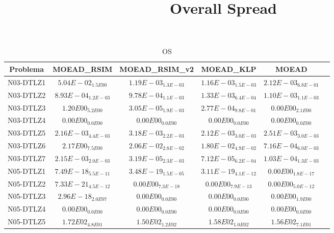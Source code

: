 \documentclass{article}
\title{Overall Spread}
\author{}
\begin{document}
\maketitle
\begin{table*}[ht!]
\scriptsize
\caption{OS}
\centering\begin{tabular}{|c||c||c||c||c||c|} \hline
Problema &MOEAD_RSIM &MOEAD_RSIM_v2 &MOEAD_KLP &MOEAD\\\hline
N03-DTLZ1 &\cellcolor{gray95}$5.04E-02_{1.5E00}$ &$1.19E-03_{1.3E-03}$ &$1.16E-03_{1.5E-03}$ &\cellcolor{gray25}$2.12E-03_{6.8E-01}$\\ 
\hline
N03-DTLZ2 &$8.93E-04_{1.2E-03}$ &$9.78E-04_{1.1E-03}$ &\cellcolor{gray95}$1.33E-03_{6.4E-04}$ &\cellcolor{gray25}$1.10E-03_{1.1E-03}$\\ 
\hline
N03-DTLZ3 &\cellcolor{gray95}$1.20E00_{5.2E00}$ &$3.05E-05_{1.9E-03}$ &\cellcolor{gray25}$2.77E-04_{9.8E-01}$ &$0.00E00_{2.1E00}$\\ 
\hline
N03-DTLZ4 &\cellcolor{gray95}$0.00E00_{0.0E00}$ &\cellcolor{gray25}$0.00E00_{0.0E00}$ &$0.00E00_{0.0E00}$ &$0.00E00_{0.0E00}$\\ 
\hline
N03-DTLZ5 &$2.16E-03_{4.4E-03}$ &\cellcolor{gray95}$3.18E-03_{2.2E-03}$ &$2.12E-03_{3.0E-03}$ &\cellcolor{gray25}$2.51E-03_{3.0E-03}$\\ 
\hline
N03-DTLZ6 &\cellcolor{gray95}$2.17E00_{7.5E00}$ &\cellcolor{gray25}$2.06E-02_{2.8E-02}$ &$1.80E-02_{4.9E-02}$ &$7.16E-04_{6.0E-03}$\\ 
\hline
N03-DTLZ7 &\cellcolor{gray95}$2.15E-03_{2.0E-03}$ &$3.19E-05_{2.3E-03}$ &$7.12E-05_{6.2E-04}$ &\cellcolor{gray25}$1.03E-04_{1.3E-03}$\\ 
\hline
N05-DTLZ1 &\cellcolor{gray95}$7.49E-18_{5.5E-11}$ &\cellcolor{gray25}$3.48E-19_{1.5E-05}$ &$3.11E-19_{4.1E-12}$ &$0.00E00_{1.8E-17}$\\ 
\hline
N05-DTLZ2 &\cellcolor{gray95}$7.33E-21_{4.5E-12}$ &\cellcolor{gray25}$0.00E00_{7.3E-18}$ &$0.00E00_{7.9E-13}$ &$0.00E00_{5.0E-12}$\\ 
\hline
N05-DTLZ3 &\cellcolor{gray95}$2.96E-18_{2.0E07}$ &\cellcolor{gray25}$0.00E00_{0.0E00}$ &$0.00E00_{0.0E00}$ &$0.00E00_{1.9E00}$\\ 
\hline
N05-DTLZ4 &\cellcolor{gray95}$0.00E00_{0.0E00}$ &\cellcolor{gray25}$0.00E00_{0.0E00}$ &$0.00E00_{0.0E00}$ &$0.00E00_{0.0E00}$\\ 
\hline
N05-DTLZ5 &\cellcolor{gray95}$1.72E02_{4.8E01}$ &$1.50E02_{1.2E02}$ &\cellcolor{gray25}$1.58E02_{1.0E02}$ &$1.56E02_{7.1E01}$\\ 

\end{tabular}
\end{table*}
\end{document}
